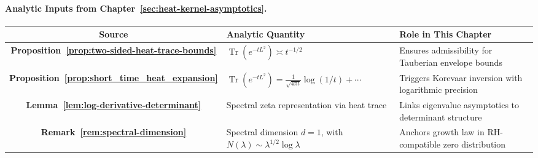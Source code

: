 \paragraph{Analytic Inputs from Chapter~\ref{sec:heat-kernel-asymptotics}.}

\begin{center}
\renewcommand{\arraystretch}{1.3}
\begin{tabularx}{\textwidth}{|c|X|X|}
\hline
\textbf{Source} & \textbf{Analytic Quantity} & \textbf{Role in This Chapter} \\
\hline
\textbf{Proposition~\ref{prop:two-sided-heat-trace-bounds}} &
\( \operatorname{Tr}(e^{-tL^2}) \asymp t^{-1/2} \) &
Ensures admissibility for Tauberian envelope bounds \\

\textbf{Proposition~\ref{prop:short_time_heat_expansion}} &
\( \operatorname{Tr}(e^{-tL^2}) = \frac{1}{\sqrt{4\pi t}} \log(1/t) + \cdots \) &
Triggers Korevaar inversion with logarithmic precision \\

\textbf{Lemma~\ref{lem:log-derivative-determinant}} &
Spectral zeta representation via heat trace &
Links eigenvalue asymptotics to determinant structure \\

\textbf{Remark~\ref{rem:spectral-dimension}} &
Spectral dimension \( d = 1 \), with \( N(\lambda) \sim \lambda^{1/2} \log \lambda \) &
Anchors growth law in RH-compatible zero distribution \\
\hline
\end{tabularx}
\end{center}
